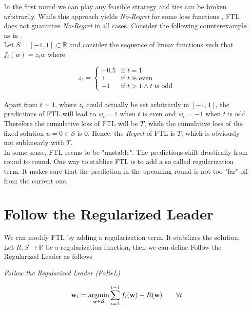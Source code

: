 In the first round we can play any feasible strategy and ties can be broken arbitrarily. While this approach yields \textit{No-Regret} for some loss functions \cite[Cor. 2.2]{shalev}, FTL does not guarantee \textit{No-Regret} in all cases. Consider the following counterexample as in \cite[Ex. 2.2]{shalev}. \\

Let $S = [-1,1] \subset \mathbb{R}$ and consider the sequence of linear functions such that $f_t(w) = z_tw$ where

\begin{equation*}
    z_t = \begin{cases}
    -0.5 &\text{if $t = 1$}\\
    1 &\text{if $t$ is even}\\
    -1 &\text{if $t > 1 \land t$ is odd}
    \end{cases}
\end{equation*} \\

Apart from $t = 1$, where $z_t$ could actually be set arbitrarily in $[-1,1]$, the predictions of FTL will lead to $w_t = 1$ when $t$ is even and $w_t = -1$ when $t$ is odd. Therefore the cumulative loss of FTL will be $T$, while the cumulative loss of the fixed solution $u = 0 \in \mathcal{S}$ is $0$. Hence, the \textit{Regret} of FTL is $T$, which is obviously not sublinearly with $T$. \\

In some sense, FTL seems to be "unstable". The predictions shift drastically from round to round. One way to stablize FTL is to add a so called regularization term. It makes sure that the prediction in the upcoming round is not too "far" off from the current one. 


\section{Follow the Regularized Leader}

We can modify FTL by adding a regularization term. It stabilizes the solution. Let $R:S \to \mathbb{R}$ be a regularization function, then we can define Follow the Regularized Leader as follows

\begin{center}
    \textit{Follow the Regularized Leader (FoReL)}    
\end{center}
\begin{equation}\label{FoReL}
    \textbf{w}_t = \operatorname*{\arg\!\min}_{\textbf{w} \in \mathcal{S}}\sum_{i=1}^{t-1}f_i(\textbf{w}) + R(\textbf{w}) \qquad \forall t
\end{equation} \\

